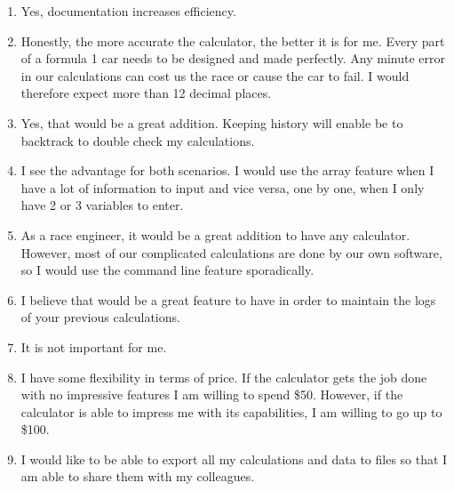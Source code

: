 \begin{itemize}
\begin{enumerate}
                        \item Yes, documentation increases efficiency.
                        \item Honestly, the more accurate the calculator, the better it is for me. Every part of a formula 1 car needs to be designed and made perfectly. Any minute error in our calculations can cost us the race or cause the car to fail. I would therefore expect more than 12 decimal places.
                        \item Yes, that would be a great addition. Keeping history will enable be to backtrack to double check my calculations.
                        \item I see the advantage for both scenarios. I would use the array feature when I have a lot of information to input and vice versa, one by one, when I only have 2 or 3 variables to enter.
                        \item As a race engineer, it would be a great addition to have any calculator. However, most of our complicated calculations are done by our own software, so I would use the command line feature sporadically.
                        \item I believe that would be a great feature to have in order to maintain the logs of your previous calculations.
                        \item It is not important for me.
                        \item I have some flexibility in terms of price. If the calculator gets the job done with no impressive features I am willing to spend \$50. However, if the calculator is able to impress me with its capabilities, I am willing to go up to \$100.
                        \item I would like to be able to export all my calculations and data to files so that I am able to share them with my colleagues.
                    \end{enumerate}
            \end{itemize}

